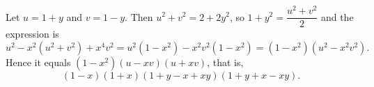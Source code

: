 Let $u=1+y$ and $v=1-y$. Then $u^2+v^2=2+2y^2$, so $1+y^2=\dfrac{u^2+v^2}{2}$ and the expression is
\[u^2-x^2(u^2+v^2)+x^4v^2=u^2(1-x^2)-x^2v^2(1-x^2)=(1-x^2)(u^2-x^2v^2).\]
Hence it equals $(1-x^2)(u-xv)(u+xv)$, that is,
\[\boxed{(1-x)(1+x)(1+y-x+xy)(1+y+x-xy)}.\]
